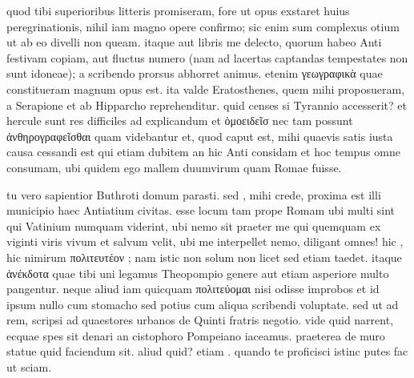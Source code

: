 


 quod tibi superioribus litteris promiseram, fore ut opus exstaret huius peregrinationis, nihil iam magno opere confirmo; sic enim sum complexus otium ut ab eo divelli non queam. itaque aut libris me delecto, quorum habeo Anti festivam copiam, aut fluctus numero (nam ad lacertas captandas tempestates non sunt idoneae); a scribendo prorsus abhorret animus. etenim γεωγραφικὰ quae constitueram magnum opus est. ita valde Eratosthenes, quem mihi proposueram, a Serapione et ab Hipparcho reprehenditur. quid censes si Tyrannio accesserit? et hercule sunt res difficiles ad explicandum et ὁμοειδεῖσ nec tam possunt ἀνθηρογραφεῖσθαι quam videbantur et, quod caput est, mihi quaevis satis iusta causa cessandi est qui etiam dubitem an hic Anti considam et hoc tempus omne consumam, ubi quidem ego mallem duumvirum quam Romae fuisse.

 tu vero sapientior Buthroti domum parasti. sed , mihi crede, proxima est illi municipio haec Antiatium civitas. esse locum tam prope Romam ubi multi sint qui Vatinium numquam viderint, ubi nemo sit praeter me qui quemquam ex viginti viris vivum et salvum velit, ubi me interpellet nemo, diligant omnes! hic , hic nimirum πολιτευτέον ; nam istic non solum non licet sed etiam taedet. itaque ἀνέκδοτα quae tibi uni legamus Theopompio genere aut etiam asperiore multo pangentur. neque aliud iam quicquam πολιτεύομαι nisi odisse improbos et id ipsum nullo cum stomacho sed potius cum aliqua scribendi voluptate. sed ut ad rem, scripsi ad quaestores urbanos de Quinti fratris negotio. vide quid narrent, ecquae spes sit denari an cistophoro Pompeiano iaceamus. praeterea de muro statue quid faciendum sit. aliud quid? etiam . quando te proficisci istinc putes fac ut sciam.

